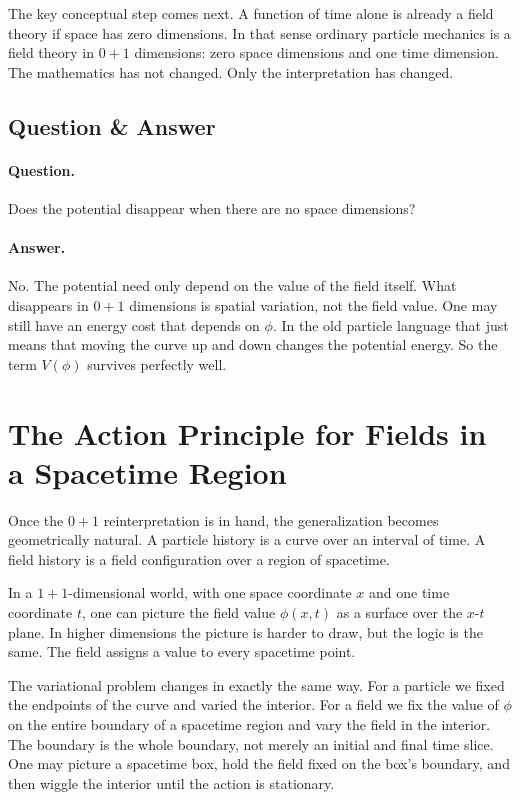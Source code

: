The key conceptual step comes next. A function of time alone is already a field theory if space has zero dimensions. In that sense ordinary particle mechanics is a field theory in \(0+1\) dimensions: zero space dimensions and one time dimension. The mathematics has not changed. Only the interpretation has changed.

\subsection{Question \& Answer}

\paragraph{Question.} Does the potential disappear when there are no space dimensions?

\paragraph{Answer.} No. The potential need only depend on the value of the field itself. What disappears in \(0+1\) dimensions is spatial variation, not the field value. One may still have an energy cost that depends on \(\phi\). In the old particle language that just means that moving the curve up and down changes the potential energy. So the term \(V(\phi)\) survives perfectly well.

\section{The Action Principle for Fields in a Spacetime Region}

Once the \(0+1\) reinterpretation is in hand, the generalization becomes geometrically natural. A particle history is a curve over an interval of time. A field history is a field configuration over a region of spacetime.

In a \(1+1\)-dimensional world, with one space coordinate \(x\) and one time coordinate \(t\), one can picture the field value \(\phi(x,t)\) as a surface over the \(x\)-\(t\) plane. In higher dimensions the picture is harder to draw, but the logic is the same. The field assigns a value to every spacetime point.

The variational problem changes in exactly the same way. For a particle we fixed the endpoints of the curve and varied the interior. For a field we fix the value of \(\phi\) on the entire boundary of a spacetime region and vary the field in the interior. The boundary is the whole boundary, not merely an initial and final time slice. One may picture a spacetime box, hold the field fixed on the box's boundary, and then wiggle the interior until the action is stationary.

